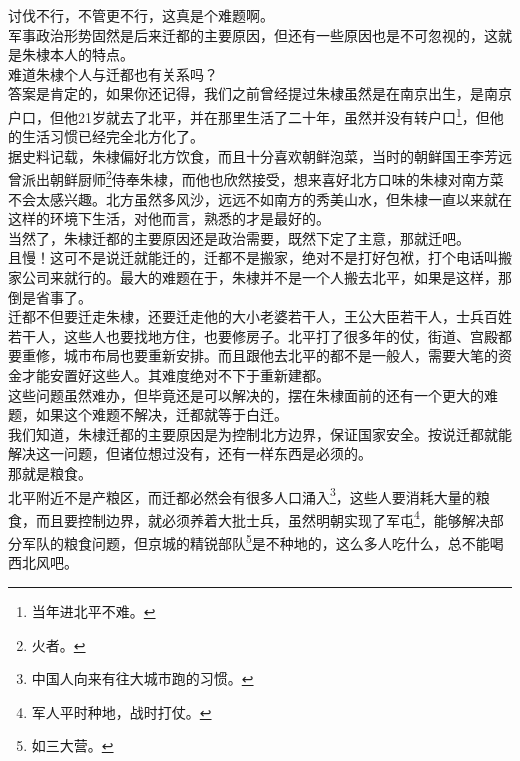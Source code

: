 \begin{multicols}{\theparacolNo}
讨伐不行，不管更不行，这真是个难题啊。\\

军事政治形势固然是后来迁都的主要原因，但还有一些原因也是不可忽视的，这就是朱棣本人的特点。\\

难道朱棣个人与迁都也有关系吗？\\

答案是肯定的，如果你还记得，我们之前曾经提过朱棣虽然是在南京出生，是南京户口，但他21岁就去了北平，并在那里生活了二十年，虽然并没有转户口\footnote{当年进北平不难。}，但他的生活习惯已经完全北方化了。\\

据史料记载，朱棣偏好北方饮食，而且十分喜欢朝鲜泡菜，当时的朝鲜国王李芳远曾派出朝鲜厨师\footnote{火者。}侍奉朱棣，而他也欣然接受，想来喜好北方口味的朱棣对南方菜不会太感兴趣。北方虽然多风沙，远远不如南方的秀美山水，但朱棣一直以来就在这样的环境下生活，对他而言，熟悉的才是最好的。\\

当然了，朱棣迁都的主要原因还是政治需要，既然下定了主意，那就迁吧。\\

且慢！这可不是说迁就能迁的，迁都不是搬家，绝对不是打好包袱，打个电话叫搬家公司来就行的。最大的难题在于，朱棣并不是一个人搬去北平，如果是这样，那倒是省事了。\\

迁都不但要迁走朱棣，还要迁走他的大小老婆若干人，王公大臣若干人，士兵百姓若干人，这些人也要找地方住，也要修房子。北平打了很多年的仗，街道、宫殿都要重修，城市布局也要重新安排。而且跟他去北平的都不是一般人，需要大笔的资金才能安置好这些人。其难度绝对不下于重新建都。\\

这些问题虽然难办，但毕竟还是可以解决的，摆在朱棣面前的还有一个更大的难题，如果这个难题不解决，迁都就等于白迁。\\

我们知道，朱棣迁都的主要原因是为控制北方边界，保证国家安全。按说迁都就能解决这一问题，但诸位想过没有，还有一样东西是必须的。\\

那就是粮食。\\

北平附近不是产粮区，而迁都必然会有很多人口涌入\footnote{中国人向来有往大城市跑的习惯。}，这些人要消耗大量的粮食，而且要控制边界，就必须养着大批士兵，虽然明朝实现了军屯\footnote{军人平时种地，战时打仗。}，能够解决部分军队的粮食问题，但京城的精锐部队\footnote{如三大营。}是不种地的，这么多人吃什么，总不能喝西北风吧。\\


\end{multicols}

